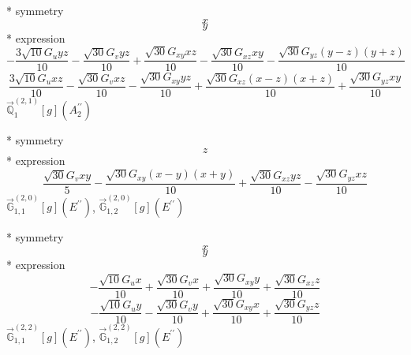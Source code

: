 \documentclass[fleqn,8pt]{jsarticle}
\begin{document}
\noindent\quad ** symmetry
\begin{dmath*}
x
\end{dmath*}
\begin{dmath*}
y
\end{dmath*}
\noindent\quad ** expression
\begin{dmath*}
- \frac{3 \sqrt{10} G_{u} y z}{10} - \frac{\sqrt{30} G_{v} y z}{10} + \frac{\sqrt{30} G_{xy} x z}{10} - \frac{\sqrt{30} G_{xz} x y}{10} - \frac{\sqrt{30} G_{yz} \left(y - z\right) \left(y + z\right)}{10}
\end{dmath*}
\begin{dmath*}
\frac{3 \sqrt{10} G_{u} x z}{10} - \frac{\sqrt{30} G_{v} x z}{10} - \frac{\sqrt{30} G_{xy} y z}{10} + \frac{\sqrt{30} G_{xz} \left(x - z\right) \left(x + z\right)}{10} + \frac{\sqrt{30} G_{yz} x y}{10}
\end{dmath*}
\noindent\quad $\vec{\mathbb{Q}}_{1}^{(2,1)}[g](A_{2}^{\prime\prime})$

\noindent\quad ** symmetry
\begin{dmath*}
z
\end{dmath*}
\noindent\quad ** expression
\begin{dmath*}
\frac{\sqrt{30} G_{v} x y}{5} - \frac{\sqrt{30} G_{xy} \left(x - y\right) \left(x + y\right)}{10} + \frac{\sqrt{30} G_{xz} y z}{10} - \frac{\sqrt{30} G_{yz} x z}{10}
\end{dmath*}
\noindent\quad $\vec{\mathbb{G}}_{1,1}^{(2,0)}[g](E^{\prime\prime})$, $\vec{\mathbb{G}}_{1,2}^{(2,0)}[g](E^{\prime\prime})$

\noindent\quad ** symmetry
\begin{dmath*}
x
\end{dmath*}
\begin{dmath*}
y
\end{dmath*}
\noindent\quad ** expression
\begin{dmath*}
- \frac{\sqrt{10} G_{u} x}{10} + \frac{\sqrt{30} G_{v} x}{10} + \frac{\sqrt{30} G_{xy} y}{10} + \frac{\sqrt{30} G_{xz} z}{10}
\end{dmath*}
\begin{dmath*}
- \frac{\sqrt{10} G_{u} y}{10} - \frac{\sqrt{30} G_{v} y}{10} + \frac{\sqrt{30} G_{xy} x}{10} + \frac{\sqrt{30} G_{yz} z}{10}
\end{dmath*}
\noindent\quad $\vec{\mathbb{G}}_{1,1}^{(2,2)}[g](E^{\prime\prime})$, $\vec{\mathbb{G}}_{1,2}^{(2,2)}[g](E^{\prime\prime})$
\end{document}
